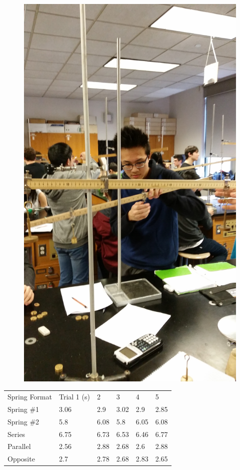 \documentclass[11pt, titlepage]{article}
\begin{document}
\begin{figure}[p]
\centering
\hspace*{-10.5cm}
\includegraphics[scale=0.15, angle=270]{lab4.jpg}
\vspace*{19cm}
\end{figure}

\begin{center}
\begin{tabular}
{|m{5em}|m{5em}|m{5em}|m{5em}|m{5em}|m{5em}|}
Spring Format & Trial 1 (s) & 2 & 3 & 4 & 5 \\
Spring \#1 & 3.06 & 2.9 & 3.02 & 2.9 & 2.85 \\
Spring \#2 & 5.8 & 6.08 & 5.8 & 6.05 & 6.08 \\
Series & 6.75 & 6.73 & 6.53 & 6.46 & 6.77 \\
Parallel & 2.56 & 2.88 & 2.68 & 2.6 & 2.88 \\
Opposite & 2.7 & 2.78 & 2.68 & 2.83 & 2.65 \\
\end{tabular}
\end{center}
\end{document}
